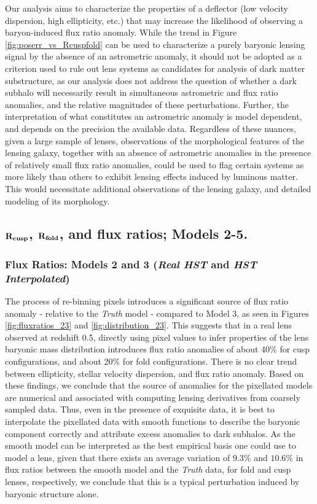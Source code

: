 \newline \indent Our analysis aims to characterize the properties of a deflector (low velocity dispersion, high ellipticity, etc.) that may increase the likelihood of observing a baryon-induced flux ratio anomaly. While the trend in Figure \ref{fig:poserr_vs_Rcuspfold} can be used to characterize a purely baryonic lensing signal by the absence of an astrometric anomaly, it should not be adopted as a criterion used to rule out lens systems as candidates for analysis of dark matter substructure, as our analysis does not address the question of whether a dark subhalo will necessarily result in simultaneous astrometric and flux ratio anomalies, and the relative magnitudes of these perturbations. Further, the interpretation of what constitutes an astrometric anomaly is model dependent, and depends on the precision the available data. Regardless of these nuances, given a large sample of lenses, observations of the morphological features of the lensing galaxy, together with an absence of astrometric anomalies in the presence of relatively small flux ratio anomalies, could be used to flag certain systems as more likely than others to exhibit lensing effects induced by luminous matter. This would necessitate additional observations of the lensing galaxy, and detailed modeling of its morphology.  
\subsection{$\bf{R_{\rm{\bf{cusp}}}}$, $\bf{R}_{\rm{\bf{fold}}}$, and flux ratios; Models 2-5.}
\subsubsection{Flux Ratios: Models 2 and 3 (\textit{Real HST} and \textit{HST Interpolated})}
The process of re-binning pixels introduces a significant source of flux ratio anomaly - relative to the \textit{Truth} model - compared to Model 3, as seen in Figures \ref{fig:fluxratios_23} and \ref{fig:distribution_23}. This suggests that in a real lens observed at redshift 0.5, directly using pixel values to infer properties of the lens baryonic mass distribution introduces flux ratio anomalies of about 40\% for cusp configurations, and about 20\% for fold configurations. There is no clear trend between ellipticity, stellar velocity dispersion, and flux ratio anomaly. Based on these findings, we conclude that the source of anomalies for the pixellated models are numerical and associated with computing lensing derivatives from coarsely sampled data. Thus, even in the presence of exquisite data, it is best to interpolate the pixellated data with smooth functions \cite[e.g. the multi-gaussian-expansion method of][]{Cap02} to describe the baryonic component correctly and attribute excess anomalies to dark subhalos. As the smooth model can be interpreted as the best empirical basis one could use to model a lens, given that there exists an average variation of $9.3\%$ and $10.6\%$ in flux ratios between the smooth model and the \textit{Truth} data, for fold and cusp lenses, respectively, we conclude that this is a typical perturbation induced by baryonic structure alone.
